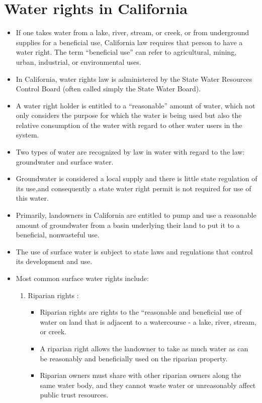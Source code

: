 \section{Water rights in California}
\begin{itemize}
\item If one takes water from a lake, river, stream, or creek, or from underground supplies for a beneficial use, California law requires that person to have a water right. The term “beneficial use” can refer to agricultural, mining, urban, industrial, or environmental uses.
\item In California, water rights law is administered by the State Water Resources Control Board (often called simply the State Water Board). 
\item A water right holder is entitled to a “reasonable” amount of water, which not only considers the purpose for which the water is being used but also the relative consumption of the water with regard to other water users in the system.
\item Two types of water are recognized by law in water with regard to the law: groundwater and surface water.
\item Groundwater is considered a local supply and there is little state regulation of its use,and consequently a state water right permit is not required for use of this water.
\item Primarily, landowners in California are entitled to pump and use a reasonable amount of groundwater from a basin underlying their land to put it to a beneficial, nonwasteful use.
\item The use of surface water is subject to state laws and regulations that control its development and use.
\item Most common surface water rights include:
\begin {enumerate}
\item Riparian rights :\\
\begin{itemize}
\item Riparian rights are rights to the “reasonable and beneficial use of water on land that is adjacent to a watercourse - a lake, river, stream, or creek. 
\item A riparian right allows the landowner to take as much water as can be reasonably and beneficially used on the riparian property. 

\item Riparian owners must share with other riparian owners along the same water body, and they cannot waste water or unreasonably affect public trust resources. 


\end{itemize}
\end{enumerate}
\end{itemize}
